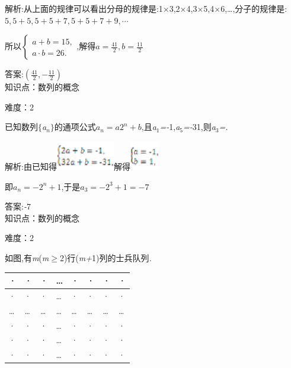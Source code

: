 \documentclass{article} %
\begin{document}
 解析:从上面的规律可以看出分母的规律是:1\textit{$\times$}3,2\textit{$\times$}4,3\textit{$\times$}5,4\textit{$\times$}6,{\dots},分子的规律是:$5,5+5,5+5+7,5+5+7+9,\cdots$

所以$
\left\{
\begin{array}{l}
a+b = 15, \\
a\cdot b=26.
\end{array}
\right.$,解得$a=\frac{41}{2},b=\frac{11}{2}$

 答案:$(\frac{41}{2},-\frac{11}{2})$ \\

知识点：数列的概念

难度：2

 已知数列$\mathrm{\{}$\textit{a${}_{n}$}$\mathrm{\}}$的通项公式$a_n=a2^n+b$,且\textit{a}${}_{1}$\textit{=-}1,\textit{a}${}_{5}$\textit{=-}31,则\textit{a}${}_{3}$\textit{=\underbar{　　　　　}.~}

 解析:由已知得\includegraphics*[width=1.00in, height=0.50in, keepaspectratio=false]{image72}解得\includegraphics*[width=0.50in, height=0.50in, keepaspectratio=false]{image73}

即$a_n = -2^n+1$,于是$a_3=-2^3+1=-7$

 答案:\textit{-}7 \\

知识点：数列的概念

难度：2

 如图,有\textit{m}(\textit{m}$\mathrm{\ge}$2)行(\textit{m+}1)列的士兵队列\textit{.}

\begin{tabular}{|p{0.1in}|p{0.1in}|p{0.1in}|p{0.1in}|p{0.1in}|p{0.1in}|p{0.1in}|p{0.1in}|} \hline 
· & · & · & {\dots} & · & · & · & · \\ \hline 
· & · & · & {\dots} & · & · & · & · \\ \hline 
{\dots} & {\dots} & {\dots} & {\dots} & {\dots} & {\dots} & {\dots} & {\dots} \\ \hline 
· & · & · & {\dots} & · & · & · & · \\ \hline 
· & · & · & {\dots} & · & · & · & · \\ \hline 
· & · & · & {\dots} & · & · & · & · \\ \hline 
\end{tabular}
\end{document}
